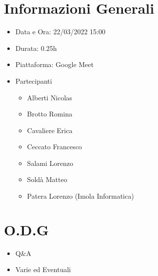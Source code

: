\documentclass[a4paper, 12pt]{article}
\begin{document}
\makefrontpage
\section*{Informazioni Generali}
\begin{itemize}
    \item Data e Ora: 22/03/2022 15:00
    \item Durata: 0.25h
    \item Piattaforma: Google Meet
    \item Partecipanti
    \begin{itemize}
        \item Alberti Nicolas
        \item Brotto Romina
        \item Cavaliere Erica
        \item Ceccato Francesco
        \item Salami Lorenzo
        \item Soldà Matteo
        \item Patera Lorenzo (Imola Informatica)
    \end{itemize}
\end{itemize}
\section*{O.D.G}
\begin{itemize}
    \item Q\&A
    \item Varie ed Eventuali
\end{itemize}
\end{document}
